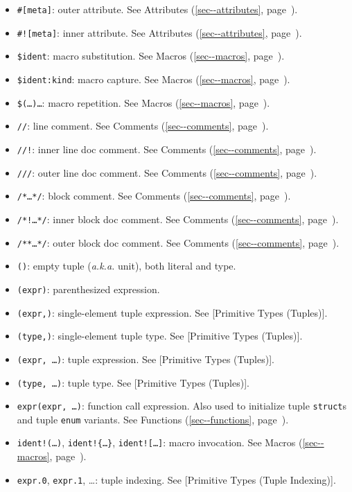 \documentclass[a4paper,]{book}
\renewcommand*{\hyperref}[2][\ar]{%
  \def\ar{#2}%
  #2 (\autoref{#1}, page~\pageref{#1})}
\begin{document}
\begin{itemize}
\itemsep1pt\parskip0pt
\item
  \texttt{\#{[}meta{]}}: outer attribute. See
  \hyperref[sec--attributes]{Attributes}.
\item
  \texttt{\#!{[}meta{]}}: inner attribute. See
  \hyperref[sec--attributes]{Attributes}.
\item
  \texttt{\$ident}: macro substitution. See
  \hyperref[sec--macros]{Macros}.
\item
  \texttt{\$ident:kind}: macro capture. See
  \hyperref[sec--macros]{Macros}.
\item
  \texttt{\$(\ldots{})\ldots{}}: macro repetition. See
  \hyperref[sec--macros]{Macros}.
\end{itemize}

\begin{itemize}
\itemsep1pt\parskip0pt
\item
  \texttt{//}: line comment. See \hyperref[sec--comments]{Comments}.
\item
  \texttt{//!}: inner line doc comment. See
  \hyperref[sec--comments]{Comments}.
\item
  \texttt{///}: outer line doc comment. See
  \hyperref[sec--comments]{Comments}.
\item
  \texttt{/*\ldots{}*/}: block comment. See
  \hyperref[sec--comments]{Comments}.
\item
  \texttt{/*!\ldots{}*/}: inner block doc comment. See
  \hyperref[sec--comments]{Comments}.
\item
  \texttt{/**\ldots{}*/}: outer block doc comment. See
  \hyperref[sec--comments]{Comments}.
\end{itemize}

\begin{itemize}
\itemsep1pt\parskip0pt
\item
  \texttt{()}: empty tuple (\emph{a.k.a.} unit), both literal and type.
\item
  \texttt{(expr)}: parenthesized expression.
\item
  \texttt{(expr,)}: single-element tuple expression. See {[}Primitive
  Types (Tuples){]}.
\item
  \texttt{(type,)}: single-element tuple type. See {[}Primitive Types
  (Tuples){]}.
\item
  \texttt{(expr,\ \ldots{})}: tuple expression. See {[}Primitive Types
  (Tuples){]}.
\item
  \texttt{(type,\ \ldots{})}: tuple type. See {[}Primitive Types
  (Tuples){]}.
\item
  \texttt{expr(expr,\ \ldots{})}: function call expression. Also used to
  initialize tuple \texttt{struct}s and tuple \texttt{enum} variants.
  See \hyperref[sec--functions]{Functions}.
\item
  \texttt{ident!(\ldots{})}, \texttt{ident!\{\ldots{}\}},
  \texttt{ident!{[}\ldots{}{]}}: macro invocation. See
  \hyperref[sec--macros]{Macros}.
\item
  \texttt{expr.0}, \texttt{expr.1}, \ldots{}: tuple indexing. See
  {[}Primitive Types (Tuple Indexing){]}.
\end{itemize}
\end{document}
